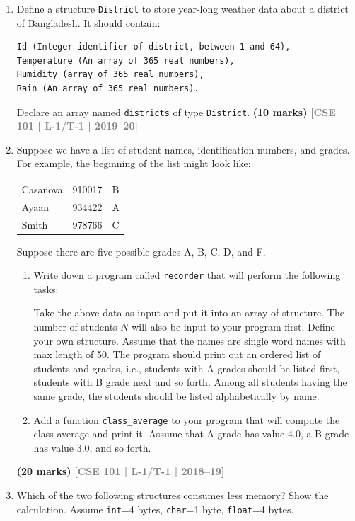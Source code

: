 \documentclass[12pt,a3paper]{article}
\newcommand{\yr}[1]{\hfill\textcolor{gray}{\small\textbf{[#1]}}}
\newcommand{\mk}[1]{\textcolor{orange!70!black}{\small\textbf{(#1 marks)}}}
\begin{document}
\begin{enumerate}
\item Define a structure \texttt{District} to store year-long weather data about a district of Bangladesh. It should contain:
\begin{lstlisting}
Id (Integer identifier of district, between 1 and 64),
Temperature (An array of 365 real numbers),
Humidity (array of 365 real numbers),
Rain (An array of 365 real numbers). 
\end{lstlisting}
Declare an array named \texttt{districts} of type \texttt{District}.
\mk{10} \yr{CSE 101 | L-1/T-1 | 2019--20}

\item Suppose we have a list of student names, identification numbers, and grades. For example, the beginning of the list might look like:
\begin{center}
    \ttfamily
    \begin{tabular}{lll}
        Casanova & 910017 & B \\
        Ayaan    & 934422 & A \\
        Smith    & 978766 & C \\
    \end{tabular}
\end{center}

Suppose there are five possible grades A, B, C, D, and F.

\begin{enumerate}
    \item[(i)] Write down a program called \texttt{recorder} that will perform the following tasks:
    
    Take the above data as input and put it into an array of structure. The number of students $N$ will also be input to your program first. Define your own structure. Assume that the names are single word names with max length of 50. The program should print out an ordered list of students and grades, i.e., students with A grades should be listed first, students with B grade next and so forth. Among all students having the same grade, the students should be listed alphabetically by name.
    
    \item[(ii)] Add a function \texttt{class\_average} to your program that will compute the class average and print it. Assume that A grade has value 4.0, a B grade has value 3.0, and so forth.
\end{enumerate}
\mk{20} \yr{CSE 101 | L-1/T-1 | 2018--19}

\item Which of the two following structures consumes less memory? Show the calculation. Assume \texttt{int}=4 bytes, \texttt{char}=1 byte, \texttt{float}=4 bytes.
 

\end{enumerate}
\end{document}
